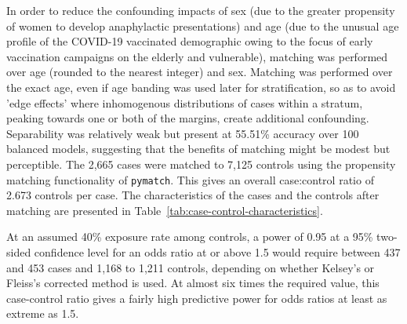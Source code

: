 \documentclass{article}
\begin{document}
In order to reduce the confounding impacts of sex (due to the greater propensity of women to develop anaphylactic presentations) and age (due to the unusual age profile of the COVID-19 vaccinated demographic owing to the focus of early vaccination campaigns on the elderly and vulnerable), matching was performed over age (rounded to the nearest integer) and sex.
Matching was performed over the exact age, even if age banding was used later for stratification, so as to avoid 'edge effects' where inhomogenous distributions of cases within a stratum, peaking towards one or both of the margins, create additional confounding.
Separability was relatively weak but present at 55.51\% accuracy over 100 balanced models, suggesting that the benefits of matching might be modest but perceptible.
The 2,665 cases were matched to 7,125 controls using the propensity matching functionality of \texttt{pymatch}.
This gives an overall case:control ratio of 2.673 controls per case.
The characteristics of the cases and the controls after matching are presented in Table~\ref{tab:case-control-characteristics}.

At an assumed 40\% exposure rate among controls, a power of 0.95 at a 95\% two-sided confidence level for an odds ratio at or above 1.5 would require between 437 and 453 cases and 1,168 to 1,211 controls, depending on whether Kelsey's or Fleiss's corrected method is used.\cite{kelsey1996methods,fleiss2013statistical}
At almost six times the required value, this case-control ratio gives a fairly high predictive power for odds ratios at least as extreme as 1.5.
\end{document}
